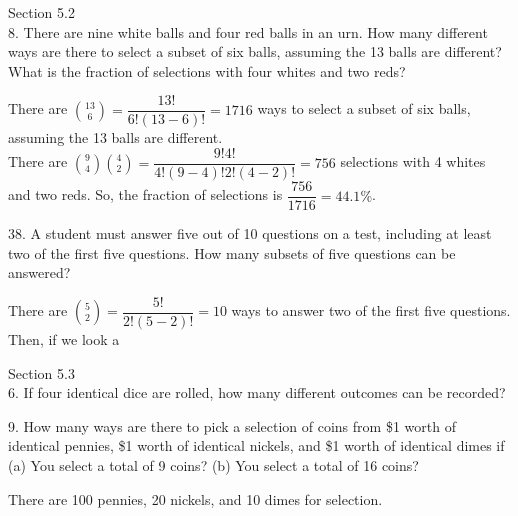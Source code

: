 \documentclass[12pt]{article}
\begin{document}
Section 5.2 \\
8. There are nine white balls and four red balls in an urn. How
many different ways are there to select a subset of six balls, 
assuming the 13 balls are different? What is the fraction of 
selections with four whites and two reds? 
\begin{solution}
    There are $\binom{13}{6}=\dfrac{13!}{6!(13-6)!}=1716$ ways to 
    select a subset of six balls, assuming the 13 balls are different. \\
    There are $\binom{9}{4}\binom{4}{2}=\dfrac{9!4!}{4!(9-4)!2!(4-2)!}
    =756$ selections with 4 whites and two reds. So, the fraction of 
    selections is $\dfrac{756}{1716}=44.1\%$.  
\end{solution}
38. A student must answer five out of 10 questions on a test, 
including at least two of the first five questions. How many 
subsets of five questions can be answered?
\begin{solution}
    There are $\binom{5}{2}=\dfrac{5!}{2!(5-2)!}=10$ ways to answer
    two of the first five questions. Then, if we look a 
\end{solution}
Section 5.3 \\
6. If four identical dice are rolled, how many different outcomes can 
be recorded?
\begin{solution}
    
\end{solution}
9. How many ways are there to pick a selection of coins from \$1 worth 
of identical pennies, \$1 worth of identical nickels, and \$1 worth of 
identical dimes if
(a) You select a total of 9 coins?
(b) You select a total of 16 coins?
\begin{solution}
    There are 100 pennies, 20 nickels, and 10 dimes for selection. 
\end{solution}
\end{document}
